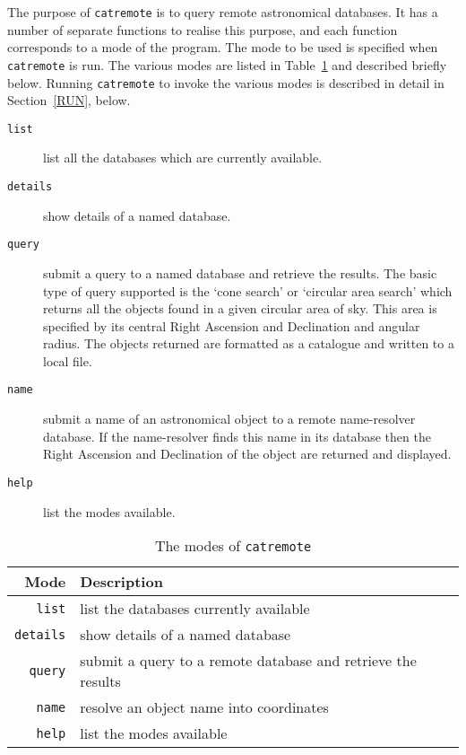 \documentclass[twoside,11pt]{article}
\renewcommand{\_}{\texttt{\symbol{95}}}
\begin{document}
The purpose of {\tt catremote} is to query remote astronomical databases.
It has a number of separate functions to realise this purpose, and each
function corresponds to a mode of the program.  The mode to be used is
specified when {\tt catremote} is run.  The various modes are listed in
Table~\ref{MODES} and described briefly below.  Running {\tt catremote} to
invoke the various modes is described in detail in Section~\ref{RUN},
below.

\begin{description}

  \item[{\tt list}] list all the databases which are currently available.

  \item[{\tt details}] show details of a named database.

  \item[{\tt query}] submit a query to a named database and retrieve the
   results.  The basic type of query supported is the `cone search' or
   `circular area search' which returns all the objects found in a given
   circular area of sky.  This area is specified by its central Right
   Ascension and Declination and angular radius.  The objects returned are
   formatted as a catalogue and written to a local file.

  \item[{\tt name}] submit a name of an astronomical object to a remote
   name-resolver database.  If the name-resolver finds this name in its
   database then the Right Ascension and Declination of the object are
   returned and displayed.

  \item[{\tt help}] list the modes available.

\end{description}

\begin{table}[htbp]

\begin{center}
\begin{tabular}{rl}
Mode          &  Description \\ \hline
{\tt list}    & list the databases currently available \\
{\tt details} & show details of a named database \\
{\tt query}   & submit a query to a remote database and retrieve the results \\
{\tt name}    & resolve an object name into coordinates \\
{\tt help}    & list the modes available \\
\end{tabular}
\end{center}

\caption{The modes of {\tt catremote}
\label{MODES} }

\end{table}
\end{document}
